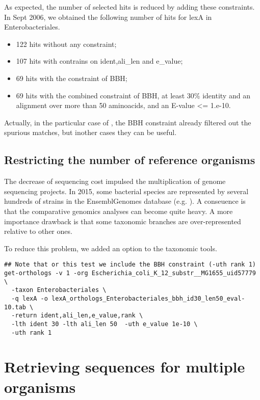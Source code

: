 As expected, the number of selected hits is reduced by adding these
constraints. In Sept 2006, we obtained the following number of hits
for lexA in Enterobacteriales.

\begin{itemize}
\item 122 hits without any constraint;
\item 107 hits with contrains on ident,ali\_len and e\_value;
\item 69 hits with the constraint of BBH;
\item 69 hits with the combined constraint of BBH, at least 30\%
  identity and an alignment over more than 50 aminoacids, and an
  E-value <= 1.e-10.
\end{itemize}

Actually, in the particular case of , the BBH constraint
already filtered out the spurious matches, but inother cases they can
be useful.


\subsection{Restricting the number of reference organisms}

The decrease of sequencing cost impulsed the multiplication of genome
sequencing projects. In 2015, some bacterial species are represented
by several hundreds of strains in the EnsemblGenomes database
(e.g. ). A conseuence is that the
comparative genomics analyses can become quite heavy. A more
importance drawback is that some taxonomic branches are
over-represented relative to other ones.

To reduce this problem, we added an option  to the
taxonomic tools.

\begin{footnotesize}
\begin{verbatim}
## Note that or this test we include the BBH constraint (-uth rank 1)
get-orthologs -v 1 -org Escherichia_coli_K_12_substr__MG1655_uid57779 \
  -taxon Enterobacteriales \
  -q lexA -o lexA_orthologs_Enterobacteriales_bbh_id30_len50_eval-10.tab \
  -return ident,ali_len,e_value,rank \
  -lth ident 30 -lth ali_len 50  -uth e_value 1e-10 \
  -uth rank 1 
\end{verbatim}
\end{footnotesize}



\section{Retrieving sequences for multiple organisms}

